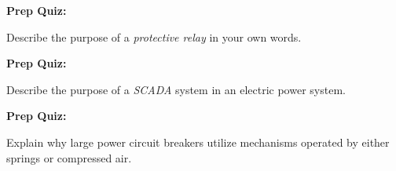 \vfil \eject

\noindent
{\bf Prep Quiz:}

Describe the purpose of a {\it protective relay} in your own words.









\vfil \eject

\noindent
{\bf Prep Quiz:}

Describe the purpose of a {\it SCADA} system in an electric power system.









\vfil \eject

\noindent
{\bf Prep Quiz:}

Explain why large power circuit breakers utilize mechanisms operated by either springs or compressed air.







